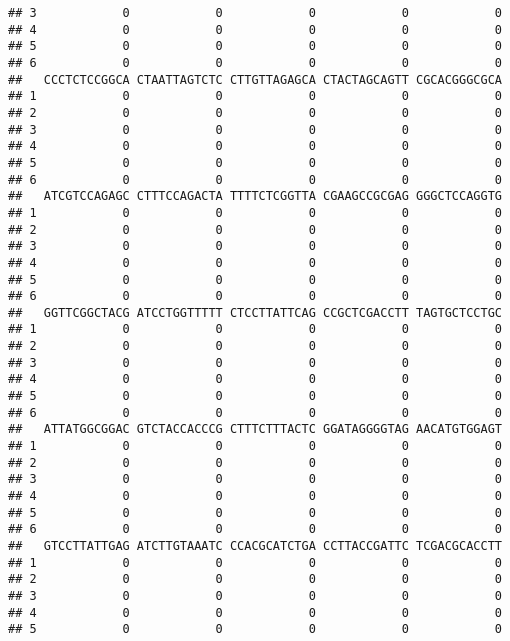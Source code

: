 \documentclass[]{article}
\begin{document}
\begin{verbatim}
## 3            0            0            0            0            0
## 4            0            0            0            0            0
## 5            0            0            0            0            0
## 6            0            0            0            0            0
##   CCCTCTCCGGCA CTAATTAGTCTC CTTGTTAGAGCA CTACTAGCAGTT CGCACGGGCGCA
## 1            0            0            0            0            0
## 2            0            0            0            0            0
## 3            0            0            0            0            0
## 4            0            0            0            0            0
## 5            0            0            0            0            0
## 6            0            0            0            0            0
##   ATCGTCCAGAGC CTTTCCAGACTA TTTTCTCGGTTA CGAAGCCGCGAG GGGCTCCAGGTG
## 1            0            0            0            0            0
## 2            0            0            0            0            0
## 3            0            0            0            0            0
## 4            0            0            0            0            0
## 5            0            0            0            0            0
## 6            0            0            0            0            0
##   GGTTCGGCTACG ATCCTGGTTTTT CTCCTTATTCAG CCGCTCGACCTT TAGTGCTCCTGC
## 1            0            0            0            0            0
## 2            0            0            0            0            0
## 3            0            0            0            0            0
## 4            0            0            0            0            0
## 5            0            0            0            0            0
## 6            0            0            0            0            0
##   ATTATGGCGGAC GTCTACCACCCG CTTTCTTTACTC GGATAGGGGTAG AACATGTGGAGT
## 1            0            0            0            0            0
## 2            0            0            0            0            0
## 3            0            0            0            0            0
## 4            0            0            0            0            0
## 5            0            0            0            0            0
## 6            0            0            0            0            0
##   GTCCTTATTGAG ATCTTGTAAATC CCACGCATCTGA CCTTACCGATTC TCGACGCACCTT
## 1            0            0            0            0            0
## 2            0            0            0            0            0
## 3            0            0            0            0            0
## 4            0            0            0            0            0
## 5            0            0            0            0            0

\end{verbatim}
\end{document}
